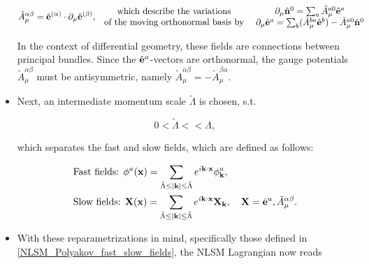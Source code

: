 \begin{itemize}
    \begin{equation}
        \begin{split}
            \tilde{A}^{\alpha \beta}_{\mu} = \hat{{\bf e}}^{(\alpha)} \cdot \partial_{\mu} \hat{{\bf e}}^{(\beta)}, \begin{array}{cc}
                 \textnormal{ which describe the variations }  \\
                 \textnormal{ of the moving orthonormal basis by }  
            \end{array} \begin{array}{cc}
                 \partial_{\mu} \hat{{\bf n}}^{0} = \sum_{a} \tilde{A}^{a0}_{\mu} \hat{{\bf e}}^{a} \\
                 \partial_{\mu} \hat{{\bf e}}^{a} = \sum_{b} (\tilde{A}^{ba}_{\mu} \hat{{\bf e}}^{b}) - \tilde{A}^{a0}_{\mu} \hat{{\bf n}}^{0}
            \end{array}
        \end{split}
    \end{equation}
    
    In the context of differential geometry, these fields are connections between principal bundles. 
    Since the $\hat{{\bf e}}^{a}$-vectors are orthonormal, the gauge potentials $\tilde{A}^{\alpha \beta}_{\mu}$ must be antisymmetric, namely $\tilde{A}^{\alpha \beta}_{\mu} = -\tilde{A}^{\beta \alpha}_{\mu}$.
    
    \item Next, an intermediate momentum scale $\tilde{\Lambda}$ is chosen, s.t.
    
    $$
        0 < \tilde{\Lambda} << \Lambda,
    $$
    
    which separates the fast and slow fields, which are defined as follows:
    
    \begin{equation}
        \begin{split}
            &\textnormal{Fast fields: } \phi^a({\bf x}) = \sum_{\tilde{\Lambda} \leq |{\bf k}| \leq \tilde{\Lambda}} e^{i {\bf k} \cdot {\bf x}} \phi_{{\bf k}}^a, \\   
            &\textnormal{Slow fields: } {\bf X}({\bf x}) = \sum_{\tilde{\Lambda} \leq |{\bf k}| \leq \tilde{\Lambda}} e^{i {\bf k} \cdot {\bf x}} {\bf X}_{{\bf k}}, \quad {\bf X} = \hat{{\bf e}}^{a}, \tilde{A}_{\mu}^{\alpha \beta}.
        \end{split}
    \end{equation}
    
    \item With these reparametrizations in mind, specifically those defined in \cref{NLSM_Polyakov_fast_slow_fields}, the NLSM Lagrangian now reads 
    

\end{itemize}
